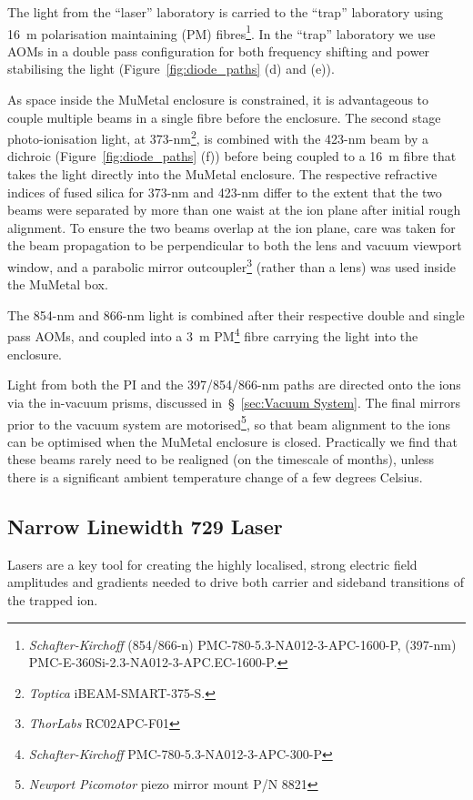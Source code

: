     The light from
    the ``laser'' laboratory is carried to the ``trap'' laboratory using 16~m
    polarisation maintaining (PM) fibres\footnote{\emph{Schafter-Kirchoff} (854/866-n) PMC-780-5.3-NA012-3-APC-1600-P, (397-nm) PMC-E-360Si-2.3-NA012-3-APC.EC-1600-P.}. In
    the ``trap'' laboratory we use AOMs in a double pass configuration for both
    frequency shifting and power stabilising the light
    (Figure~\ref{fig:diode_paths} (d) and (e)). 

    As space inside the MuMetal enclosure is constrained, it is advantageous to
    couple multiple beams in a single fibre before the enclosure.
    The second stage photo-ionisation light, at 373-nm\footnote{\emph{Toptica} iBEAM-SMART-375-S.},
    is combined with the 423-nm beam by a dichroic
    (Figure~\ref{fig:diode_paths} (f)) before being coupled to a 16~m fibre that
    takes the light directly into the MuMetal enclosure. The respective
    refractive indices of fused silica  for 373-nm and 423-nm differ to the
    extent that the two beams were separated by more than one waist at the ion
    plane after initial rough alignment. To ensure the two beams overlap at the
    ion plane, care was taken for the beam propagation to be perpendicular to
    both the lens and vacuum viewport window, and a parabolic mirror
    outcoupler\footnote{\emph{ThorLabs} RC02APC-F01} (rather than a lens) was
    used inside the MuMetal box.

    The 854-nm and 866-nm light is combined after
    their respective double and single pass AOMs, and coupled into a 3~m PM\footnote{\emph{Schafter-Kirchoff} PMC-780-5.3-NA012-3-APC-300-P}
    fibre carrying the light into the enclosure.

    Light from both the PI and the 397/854/866-nm paths are directed onto the
    ions via the in-vacuum prisms, discussed in~\S~\ref{sec:Vacuum System}.
    The final mirrors prior to the vacuum system are
    motorised\footnote{\emph{Newport Picomotor} piezo mirror mount P/N 8821}, so that beam alignment to the ions
    can be optimised when the MuMetal enclosure is closed. Practically we find
    that these beams rarely need to be realigned (on the timescale of months), unless there is a
    significant ambient temperature change of a few degrees Celsius.



\subsection{Narrow Linewidth 729 Laser}
\label{sec:Narrow Linewidth 729 Laser} 
    Lasers are a key tool for creating the highly localised, strong electric
    field amplitudes and gradients needed to drive both carrier and sideband
    transitions of the trapped ion.

